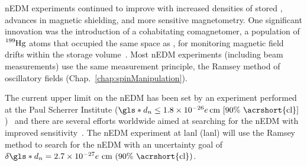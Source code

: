 nEDM experiments continued to improve with increased densities of stored \ucn, advances in magnetic shielding, and more sensitive magnetometry. One significant innovation was the introduction of a cohabitating comagnetomer, a population of $\ce{^{199}Hg}$ atoms that occupied the same space as \ucn, for monitoring magnetic field drifts within the storage volume~\cite{BAK06}. Most nEDM experiments (including beam measurements) use the same measurement principle, the Ramsey method of oscillatory fields \cite{ramsey_molecular_1950} (Chap.~\ref{chap:spinManipulation}). 

The current upper limit on the nEDM has been set by an experiment performed at the Paul Scherrer Institute ($\gls*{d_n}\leq 1.8\times10^{-26}e\,\text{cm [90\% \acrshort{cl}]}$)~\cite{ABE20} and there are several efforts worldwide aimed at searching for the nEDM with improved sensitivity~\cite{Alarcon2022}. The nEDM experiment at \acrlong*{lanl} (\acrshort*{lanl}) will use the Ramsey method to search for the nEDM with an uncertainty goal of $\delta \gls*{d_n} = 2.7\times10^{-27}e\text{ cm (90\% \acrshort{cl})}$.

